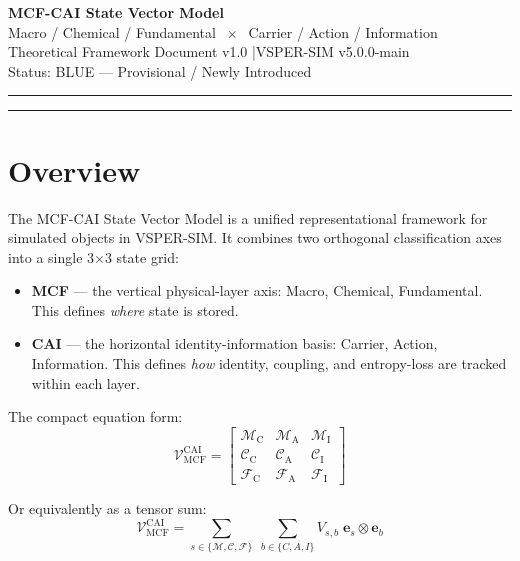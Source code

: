 \documentclass[11pt, a4paper, oneside]{article}
\theoremstyle{definition}
\theoremstyle{plain}
\theoremstyle{remark}
\newcommand{\Macro}{\mathscr{M}}          %
\newcommand{\Chem}{\mathscr{C}}           %
\newcommand{\Fund}{\mathscr{F}}           %
\newcommand{\MC}{\Macro_{\mathrm{C}}}
\newcommand{\MA}{\Macro_{\mathrm{A}}}
\newcommand{\MI}{\Macro_{\mathrm{I}}}
\newcommand{\CC}{\Chem_{\mathrm{C}}}
\newcommand{\CA}{\Chem_{\mathrm{A}}}
\newcommand{\CI}{\Chem_{\mathrm{I}}}
\newcommand{\FC}{\Fund_{\mathrm{C}}}
\newcommand{\FA}{\Fund_{\mathrm{A}}}
\newcommand{\FI}{\Fund_{\mathrm{I}}}
\newcommand{\Vobj}{\mathcal{V}_{\mathrm{MCF}}^{\mathrm{CAI}}}
\begin{document}

\begin{center}
  {\LARGE\bfseries MCF-CAI State Vector Model}\\[0.5em]
  {\large Macro / Chemical / Fundamental $\;\times\;$ Carrier / Action / Information}\\[0.3em]
  {\normalsize Theoretical Framework Document v1.0 \quad|\quad VSPER-SIM v5.0.0-main}\\[0.5em]
  {\small Status: \colorbox{InfoBG}{BLUE --- Provisional / Newly Introduced}}
\end{center}

\vspace{0.5em}
\noindent\rule{\linewidth}{2pt}
\tableofcontents
\noindent\rule{\linewidth}{1pt}
\newpage

\section{Overview}

The MCF-CAI State Vector Model is a unified representational framework for
simulated objects in VSPER-SIM. It combines two orthogonal classification axes
into a single 3$\times$3 state grid:

\begin{itemize}
  \item \textbf{MCF} --- the vertical physical-layer axis: Macro, Chemical, Fundamental.
        This defines \emph{where} state is stored.
  \item \textbf{CAI} --- the horizontal identity-information basis: Carrier, Action, Information.
        This defines \emph{how} identity, coupling, and entropy-loss are tracked
        within each layer.
\end{itemize}

The compact equation form:
\[
  \boxed{
    \Vobj =
    \begin{bmatrix}
      \MC & \MA & \MI \\
      \CC & \CA & \CI \\
      \FC & \FA & \FI
    \end{bmatrix}
  }
\]

Or equivalently as a tensor sum:
\[
  \Vobj = \sum_{s \in \{\Macro,\Chem,\Fund\}} \;\sum_{b \in \{C,A,I\}} V_{s,b}\; \mathbf{e}_s \otimes \mathbf{e}_b
\]
\end{document}
